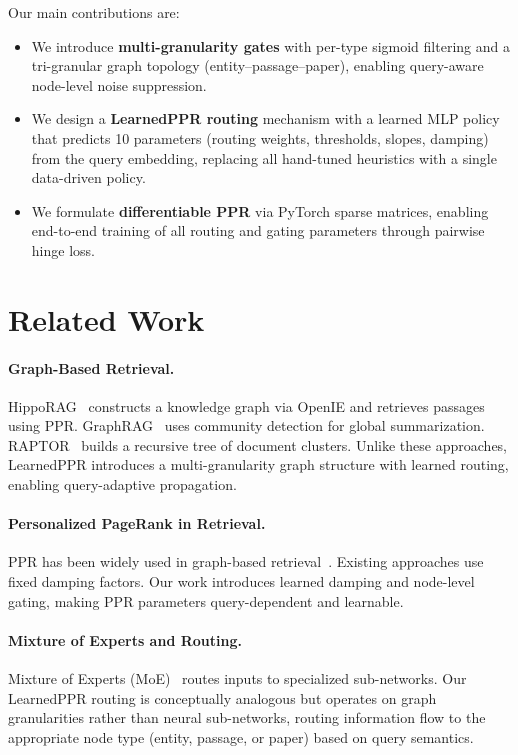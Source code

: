 \documentclass[conference,a4paper]{IEEEtran}
\begin{document}
Our main contributions are:
\begin{itemize}[leftmargin=*, itemsep=2pt]
    \item We introduce \textbf{multi-granularity gates} with per-type sigmoid filtering and a tri-granular graph topology (entity--passage--paper), enabling query-aware node-level noise suppression.
    \item We design a \textbf{LearnedPPR routing} mechanism with a learned MLP policy that predicts 10 parameters (routing weights, thresholds, slopes, damping) from the query embedding, replacing all hand-tuned heuristics with a single data-driven policy.
    \item We formulate \textbf{differentiable PPR} via PyTorch sparse matrices, enabling end-to-end training of all routing and gating parameters through pairwise hinge loss.
\end{itemize}

\section{Related Work}\label{sec:related}

\paragraph{Graph-Based Retrieval.}
HippoRAG~\cite{gutierrez2024hipporag} constructs a knowledge graph via OpenIE and retrieves passages using PPR. GraphRAG~\cite{edge2024graphrag} uses community detection for global summarization. RAPTOR~\cite{sarthi2024raptor} builds a recursive tree of document clusters. Unlike these approaches, LearnedPPR introduces a multi-granularity graph structure with learned routing, enabling query-adaptive propagation.

\paragraph{Personalized PageRank in Retrieval.}
PPR has been widely used in graph-based retrieval~\cite{chakrabarti2006graph,gleich2015pagerank}. Existing approaches use fixed damping factors. Our work introduces learned damping and node-level gating, making PPR parameters query-dependent and learnable.

\paragraph{Mixture of Experts and Routing.}
Mixture of Experts (MoE)~\cite{shazeer2017moe} routes inputs to specialized sub-networks. Our LearnedPPR routing is conceptually analogous but operates on graph granularities rather than neural sub-networks, routing information flow to the appropriate node type (entity, passage, or paper) based on query semantics.
\end{document}
